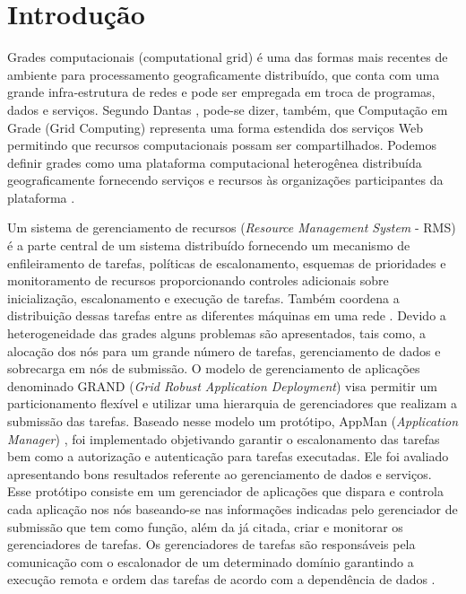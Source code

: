 \chapter{Introdução}
\label{cap:introducao}

Grades computacionais (computational grid) é uma das formas mais recentes de ambiente para processamento geograficamente distribuído, que conta com uma grande infra-estrutura de redes e pode ser empregada em troca de programas, dados e serviços. Segundo Dantas \cite{Dantas2005}, pode-se dizer, também, que Computação em Grade (Grid Computing) representa uma forma estendida dos serviços Web permitindo que recursos computacionais possam ser compartilhados. Podemos definir grades como uma plataforma computacional heterogênea distribuída geograficamente fornecendo serviços e recursos às organizações participantes da plataforma \cite{Dantas2005}. 
       
Um sistema de gerenciamento de recursos (\emph{Resource Management System} - RMS) é a parte central de um sistema distribuído fornecendo um mecanismo de enfileiramento de tarefas, políticas de escalonamento, esquemas de prioridades e monitoramento de recursos proporcionando controles adicionais sobre inicialização, escalonamento e execução de tarefas. Também coordena a distribuição dessas tarefas entre as diferentes máquinas em uma rede \cite{condor2007, Bayucan2007, Mangan2006}. Devido a heterogeneidade das grades alguns problemas são apresentados, tais como, a alocação dos nós para um grande número de tarefas, gerenciamento de dados e sobrecarga em nós de submissão. O modelo de gerenciamento de aplicações denominado GRAND (\emph{Grid Robust Application Deployment}) \cite{Mangan2006} visa permitir um particionamento flexível e utilizar uma hierarquia de gerenciadores que realizam a submissão das tarefas. Baseado nesse modelo um protótipo, AppMan (\emph{Application Manager}) \cite{Vargas2003}, foi implementado objetivando garantir o escalonamento das tarefas bem como a autorização e autenticação para tarefas executadas. Ele foi avaliado apresentando bons resultados referente ao gerenciamento de dados e serviços. Esse protótipo consiste em um gerenciador de aplicações que dispara e controla cada aplicação nos nós baseando-se nas informações indicadas pelo gerenciador de submissão que tem como função, além da já citada, criar e monitorar os gerenciadores de tarefas. Os gerenciadores de tarefas são responsáveis pela comunicação com o escalonador de um determinado domínio garantindo a execução remota e ordem das tarefas de acordo com a dependência de dados \cite{Mangan2006}.

